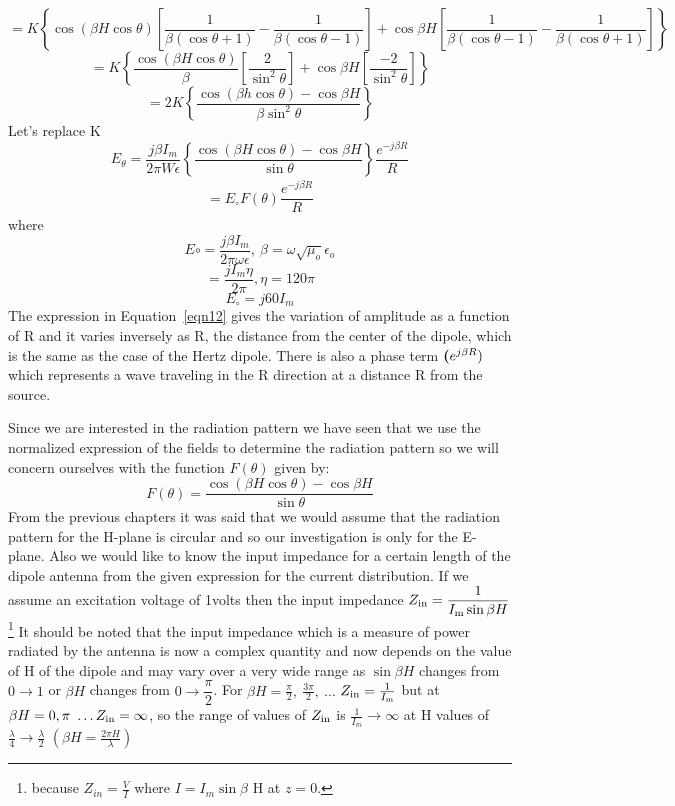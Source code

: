 \begin{dmath*}
=K\left\lbrace\cos(\beta H\cos \theta)\left[\dfrac{1}{\beta(\cos \theta + 1)}- \dfrac{1}{\beta(\cos\theta - 1)}\right] + \cos \beta H\left[\dfrac{1}{\beta(\cos\theta  - 1)} - \dfrac{1}{\beta(\cos\theta + 1)}\right]\right\rbrace
\end{dmath*}
$$=K\left\lbrace\dfrac{\cos(\beta H\cos \theta)}{\beta} \left[\dfrac{2}{\sin^{2}\theta}\right] + \cos \beta H\left[\dfrac{-2}{\sin^{2}\theta}\right] \right\rbrace$$
$$=2K \left\lbrace\dfrac{\cos(\beta h\cos\theta) - \cos\beta H}{\beta\sin^{2}\theta}\right\rbrace$$
Let's replace K
$$E_{\theta} = \dfrac{j\beta I_m}{2\pi W\epsilon}\left\{\dfrac{\cos(\beta H\cos \theta)- \cos \beta H}{\sin\theta}\right\} \dfrac{e^{-j\beta R}}{R}$$
\begin{align}
=E_\circ F(\theta) \dfrac{e^{-j\beta R}}{R}
\label{eqn12}
\end{align}
where $$E\circ= \dfrac{j\beta I_m}{2\pi \omega\epsilon} ,\ \beta=\omega\sqrt{\mu_o} \epsilon_o$$ 
$$ =\dfrac{jI_m\eta}{2\pi}, \eta =120\pi$$
$$E_\circ= j60I_m $$
The expression in Equation~\ref{eqn12} gives the variation of amplitude as a function of R and it varies inversely as R, the distance from the center of the dipole, which is the same as the case of the Hertz dipole. There is also a phase term $\textbf(e^{j\beta R})$ which represents a wave traveling in the R direction at a distance R from the source.

Since we are interested in the radiation pattern we have seen that we use the normalized expression of the fields to determine the radiation pattern so we will concern ourselves with the function $F(\theta)$ given by:
$$F(\theta) = \dfrac{\cos(\beta H\cos\theta) - \cos \beta H}{\sin \theta}$$
From the previous chapters  it was said that we would assume that the radiation pattern for the H-plane is circular and so our investigation is only for the E-plane. Also we would like to know the input impedance for a certain length of the dipole antenna from the given expression for the current distribution. If we assume an excitation voltage of 1volts then the input impedance $Z_{\textnormal{in}} = \dfrac{1}{I_{\textnormal{m}} \sin \beta H}$\footnote{because $Z_{in}=\frac{V}{I}$ where $I = I_m\sin\beta$ H at $z= 0$.}
It should be noted that the input impedance which is a measure of power radiated by the antenna is now a complex quantity and now depends on the value of H of the dipole and may vary over a very wide range as $\sin \beta H$ changes from $0 \rightarrow 1$ or $\beta H$ changes from $0\rightarrow\dfrac{\pi}{2}$. For $\beta H = \frac{\pi}{2},\ \frac{3\pi}{2},\ \ldots$ $Z_{\textnormal{in}}=\frac{1}{I_{\textnormal{m}}}$ but at $\beta H = 0, \pi\ \ldots Z_{\textnormal{in}} =\infty$, so the range of values of $Z_{\textnormal{in}}$ is ${\frac{1}{I_m}}\rightarrow \infty$ at H values of ${\frac{\lambda}{4}} \rightarrow \frac{\lambda}{2}$ $(\beta H = \frac{2 \pi H}{\lambda})$

